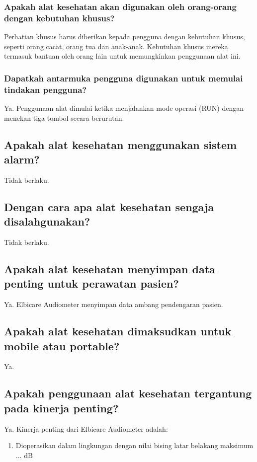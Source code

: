 \documentclass[11pt,a4paper,twoside,onecolumn]{book}
\begin{document}
				\subsubsection{Apakah alat kesehatan akan digunakan oleh orang-orang dengan kebutuhan khusus?}
				Perhatian khusus harus diberikan kepada pengguna dengan kebutuhan khusus, seperti orang cacat, orang tua dan anak-anak. Kebutuhan khusus mereka termasuk bantuan oleh orang lain untuk memungkinkan penggunaan alat ini.
				
				\subsubsection{Dapatkah antarmuka pengguna digunakan untuk memulai tindakan pengguna?}
				Ya. Penggunaan alat dimulai ketika menjalankan mode operasi (RUN) dengan menekan tiga tombol secara berurutan.
			
			\subsection{Apakah alat kesehatan menggunakan sistem alarm?}
			Tidak berlaku.
			
			\subsection{Dengan cara apa alat kesehatan sengaja disalahgunakan?}
			Tidak berlaku.
			
			\subsection{Apakah alat kesehatan menyimpan data penting untuk perawatan pasien?}
			Ya. Elbicare Audiometer menyimpan data ambang pendengaran pasien.
			
			\subsection{Apakah alat kesehatan dimaksudkan untuk mobile atau portable?}
			Ya. 
			
			\subsection{Apakah penggunaan alat kesehatan tergantung pada kinerja penting?}
			Ya. Kinerja penting dari Elbicare Audiometer adalah:
			\begin{enumerate}
				\item Dioperasikan dalam lingkungan dengan nilai bising latar belakang maksimum ... dB
			\end{enumerate}
		
\end{document}
